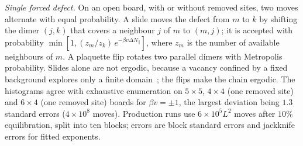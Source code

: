 \documentclass[aps,pre,twocolumn,superscriptaddress,nofootinbib,floatfix]{revtex4-2}
\begin{document}
\emph{Single forced defect.} On an open board, with or without removed sites, two moves alternate with equal probability. A slide moves the defect from $m$ to $k$ by shifting the dimer $(j,k)$ that covers a neighbour $j$ of $m$ to $(m,j)$; it is accepted with probability $\min[1,(z_m/z_k)\,e^{-\beta v\Delta N_\parallel}]$, where $z_m$ is the number of available neighbours of $m$. A plaquette flip rotates two parallel dimers with Metropolis probability. Slides alone are not ergodic, because a vacancy confined by a fixed background explores only a finite domain~\cite{Bouttier2007}; the flips make the chain ergodic. The histograms agree with exhaustive enumeration on $5\times5$, $4\times4$ (one removed site) and $6\times4$ (one removed site) boards for $\beta v=\pm1$, the largest deviation being $1.3$ standard errors ($4\times10^8$ moves). Production runs use $6\times10^5L^2$ moves after $10\%$ equilibration, split into ten blocks; errors are block standard errors and jackknife errors for fitted exponents.
\end{document}
